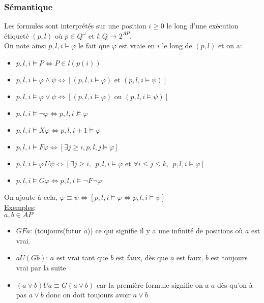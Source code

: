 \documentclass[12pt,a4paper]{article}
\begin{document}
\subsubsection{Sémantique}
Les formules sont interprétés sur une position $i \geq 0$ le long d'une exécution étiqueté $(p, l)$ où $p \in Q^{\omega}$ et $l : Q \to 2^{AP}$. \\
On note ainsi $p, l, i \models \varphi$ le fait que $\varphi$ est vraie en $i$ le long de $(p, l)$ et on a: 
\begin{itemize}
	\item $p, l, i \models P \Leftrightarrow P \in l(p(i))$ 
	\item $p, l, i \models \varphi \land \psi \Leftrightarrow [(p,l,i \models \varphi) \textrm{ et } (p,l,i \models \psi)]$
	\item $p,l,i \models \varphi \lor \psi \Leftrightarrow [(p,l,i \models \varphi)\textrm{ ou } (p,l,i \models \psi)]$
	\item $p,l,i \models \lnot \varphi \Leftrightarrow p,l,i \not \models \varphi$
	\item $p,l,i \models X\varphi \Leftrightarrow p,l,i+1 \models \varphi$
	\item $p,l,i \models F\varphi \Leftrightarrow [\exists j \geq i, p,l,j \models \varphi]$
	\item $p,l,i \models \varphi\, U \psi \Leftrightarrow [\exists j \geq i, \:\: p,l,i \models \varphi \textrm{ et } \forall i \leq j \leq k, \:\: p,l,i\models \varphi]$
	\item $p,l,i \models G\varphi \Leftrightarrow p,l,i \models \lnot F\lnot \varphi$
	
\end{itemize}
On ajoute à cela, $\varphi \equiv \psi \Leftrightarrow [p,l,i \models \varphi \Leftrightarrow p,l,i \models \psi]$\\
\vspace*{2mm}
\underline{Exemples}: \\
$a, b \in AP$
\begin{itemize}
	\item $GFa$: (toujours(futur $a$)) ce qui signifie il y a une infinité de positions où $a$ est vrai.
	\item $aU(Gb)$: $a$ est vrai tant que $b$ est faux, dès que $a$ est faux, $b$ est toujours vrai par la suite
	\item $(a\lor b ) U a \equiv G(a \lor b)$ car la première formule signifie on a $a$ dès qu'on à pas $a\lor b$ donc on doit toujours avoir $a \lor b$
	
\end{itemize}
\end{document}
